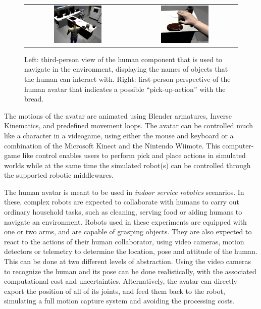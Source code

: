 \documentclass{llncs}
\begin{document}
\begin{figure}[ht!]
\centering
\begin{tabular}{cc}
 \includegraphics[width=0.475\textwidth]{pics/human_control_1.png} &
 \includegraphics[width=0.475\textwidth]{pics/human_control_2.png}
\end{tabular}
\caption{Left: third-person view of the human component that is used to
    navigate in the environment, displaying the names of objects that the human
    can interact with. Right: first-person perspective of the human avatar that
    indicates a possible ``pick-up-action'' with the bread.}
\label{fig:human_control}
\end{figure}

The motions of the avatar are animated using Blender %
armatures, Inverse Kinematics, and predefined movement loops.
The avatar can be controlled much like a character in a videogame, using either
the mouse and keyboard or a combination of the Microsoft Kinect and the
Nintendo Wiimote. This computer-game like control enables users to perform
pick and place actions in simulated worlds while at the same time the
simulated robot(s) can be controlled through the supported robotic middlewares.


The human avatar is meant to be used in \emph{indoor service robotics} scenarios.
In these, complex robots are expected to collaborate with humans to carry out
ordinary household tasks, such as cleaning, serving food or aiding humans to
navigate an environment.
Robots used in these experiments are equipped with one or two arms, and are
capable of grasping objects. They are also expected to react to the actions of
their human collaborator, using video cameras, motion detectors or telemetry to
determine the location, pose and attitude of the human.
This can be done at two different levels of
abstraction. Using the video cameras to recognize the human and its pose can be
done realistically, with the associated computational cost and uncertainties.
Alternatively, the avatar can directly export the position of all of its
joints, and feed them back to the robot, simulating a full motion capture
system and avoiding the processing costs.
\end{document}
